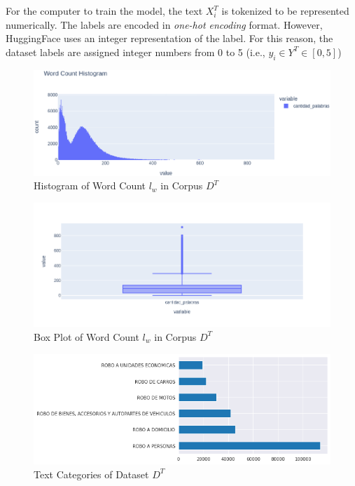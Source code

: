 \documentclass[onecolumn, journal, english, 12pt, a4paper]{IEEEtran} %
\theoremstyle{definition}
\begin{document}
\begin{enumerate}
  For the computer to train the model, the text $X^T_i$ is tokenized
  to be represented numerically. The labels are encoded in
  \emph{one-hot encoding} format. However, HuggingFace uses an integer
  representation of the label. For this reason, the dataset labels are
  assigned integer numbers from 0 to 5 (i.e., $y_i \in Y^T \in [0,5]$)
\end{enumerate}

\begin{figure}[!t]
    \centering
    \includegraphics[width=\textwidth]{imgs/histograma.eps}
    \caption{Histogram of Word Count $l_w$ in Corpus $D^T$}
    \label{fig:histogramalw}
\end{figure}

\begin{figure}[!t]
    \centering
    \includegraphics[width=\textwidth]{imgs/boxplot.png}
    \caption{Box Plot of Word Count $l_w$ in Corpus $D^T$}
    \label{fig:boxplotlw}
\end{figure}

\begin{figure}[!t]
    \centering
    \includegraphics[width=\textwidth]{imgs/categorias.png}
    \caption{Text Categories of Dataset $D^T$}
    \label{fig:categorias}
\end{figure}
\end{document}
